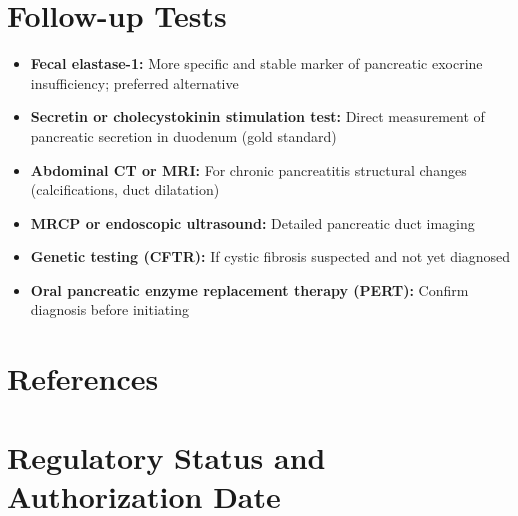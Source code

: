 \section*{Follow-up Tests}
\begin{itemize}
  \item \textbf{Fecal elastase-1:} More specific and stable marker of pancreatic exocrine insufficiency; preferred alternative
  \item \textbf{Secretin or cholecystokinin stimulation test:} Direct measurement of pancreatic secretion in duodenum (gold standard)
  \item \textbf{Abdominal CT or MRI:} For chronic pancreatitis structural changes (calcifications, duct dilatation)
  \item \textbf{MRCP or endoscopic ultrasound:} Detailed pancreatic duct imaging
  \item \textbf{Genetic testing (CFTR):} If cystic fibrosis suspected and not yet diagnosed
  \item \textbf{Oral pancreatic enzyme replacement therapy (PERT):} Confirm diagnosis before initiating
\end{itemize}

\section*{References}



\clearpage
\section*{Regulatory Status and Authorization Date}

\clearpage
